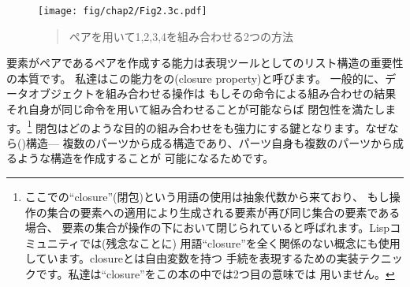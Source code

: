 \begin{figure}[tb]
\label{Figure 2.3}
\centering
\begin{comment}
\heading{Figure 2.3:} Two ways to combine 1, 2, 3, and 4 using pairs.

\begin{example}
     +---+---+     +---+---+         +---+---+     +---+
---->| * | *-+---->| * | * |    ---->| * | *-+---->| 4 |
     +-|-+---+     +-|-+-|-+         +-|-+---+     +---+
       |             |   |             |
       V             V   V             V
   +---+---+      +---+ +---+      +---+---+     +---+---+
   | * | * |      | 3 | | 4 |      | * | *-+---->| * | * |
   +-|-+-|-+      +---+ +---+      +-|-+---+     +-|-+-|-+
     |   |                           |             |   |
     V   V                           V             V   V
  +---+ +---+                      +---+        +---+ +---+
  | 1 | | 2 |                      | 1 |        | 2 | | 3 |
  +---+ +---+                      +---+        +---+ +---+

  (cons (cons 1 2)                 (cons (cons 1
        (cons 3 4))                            (cons 2 3))
                                         4)
\end{example}
\end{comment}
\texttt{[image: fig/chap2/Fig2.3c.pdf]}
\begin{quote}
 ペアを用いて1,2,3,4を組み合わせる2つの方法
\end{quote}
\end{figure}

\noindent
要素がペアであるペアを作成する能力は表現ツールとしてのリスト構造の重要性の本質です。
私達はこの能力をの(closure property)と呼びます。
一般的に、データオブジェクトを組み合わせる操作は
もしその命令による組み合わせの結果それ自身が同じ命令を用いて組み合わせることが可能ならば
閉包性を満たします。\footnote{
ここでの``closure''(閉包)という用語の使用は抽象代数から来ており、
もし操作の集合の要素への適用により生成される要素が再び同じ集合の要素である場合、
要素の集合が操作の下において閉じられていると呼ばれます。Lispコミュニティでは(残念なことに)
用語``closure''を全く関係のない概念にも使用しています。closureとは自由変数を持つ
手続を表現するための実装テクニックです。私達は``closure''をこの本の中では2つ目の意味では
用いません。}
閉包はどのような目的の組み合わせをも強力にする鍵となります。なぜなら()構造---
複数のパーツから成る構造であり、パーツ自身も複数のパーツから成るような構造を作成することが
可能になるためです。



